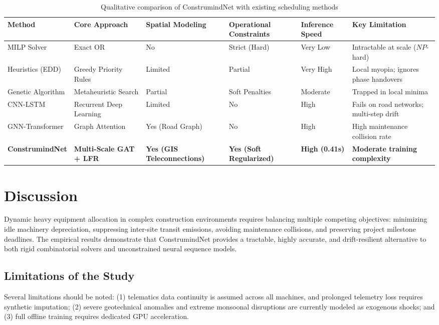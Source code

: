 \documentclass[11pt,a4paper]{article}
\begin{document}
\begin{table}[t]
\centering
\small
\caption{Qualitative comparison of ConstrumindNet with existing scheduling methods}\label{tab:qual}
\begin{tabularx}{\textwidth}{l p{2.8cm} l l l X}
\toprule
\textbf{Method} & \textbf{Core Approach} & \textbf{Spatial Modeling} & \textbf{Operational Constraints} & \textbf{Inference Speed} & \textbf{Key Limitation} \\
\midrule
MILP Solver \cite{hossain2025} & Exact OR & No & Strict (Hard) & Very Low & Intractable at scale ($NP$-hard) \\
Heuristics (EDD) \cite{ejiyi2025} & Greedy Priority Rules & Limited & Partial & Very High & Local myopia; ignores phase handovers \\
Genetic Algorithm \cite{nguyen2024} & Metaheuristic Search & Partial & Soft Penalties & Moderate & Trapped in local minima \\
CNN-LSTM \cite{inam2024} & Recurrent Deep Learning & Limited & No & High & Fails on road networks; multi-step drift \\
GNN-Transformer \cite{liu2025} & Graph Attention & Yes (Road Graph) & No & High & High maintenance collision rate \\
\midrule
\textbf{ConstrumindNet} & \textbf{Multi-Scale GAT + LFR} & \textbf{Yes (GIS Teleconnections)} & \textbf{Yes (Soft Regularized)} & \textbf{High (0.41s)} & \textbf{Moderate training complexity} \\
\bottomrule
\end{tabularx}
\end{table}

\section{Discussion}\label{sec:disc}
Dynamic heavy equipment allocation in complex construction environments requires balancing multiple competing objectives: minimizing idle machinery depreciation, suppressing inter-site transit emissions, avoiding maintenance collisions, and preserving project milestone deadlines. The empirical results demonstrate that ConstrumindNet provides a tractable, highly accurate, and drift-resilient alternative to both rigid combinatorial solvers and unconstrained neural sequence models. 

\subsection{Limitations of the Study}
Several limitations should be noted: (1) telematics data continuity is assumed across all machines, and prolonged telemetry loss requires synthetic imputation; (2) severe geotechnical anomalies and extreme monsoonal disruptions are currently modeled as exogenous shocks; and (3) full offline training requires dedicated GPU acceleration.
\end{document}

